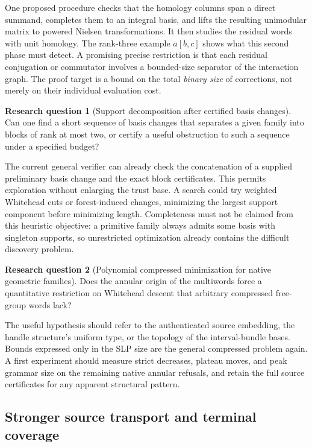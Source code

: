 \documentclass[11pt,a4paper]{article}
\theoremstyle{definition}
\newtheorem{question}{Research question}
\theoremstyle{remark}
\begin{document}
One proposed procedure checks that the homology columns span a direct
summand, completes them to an integral basis, and lifts the resulting
unimodular matrix to powered Nielsen transformations. It then studies the
residual words with unit homology. The rank-three example $a[b,c]$ shows
what this second phase must detect. A promising precise restriction is
that each residual conjugation or commutator involves a bounded-size
separator of the interaction graph. The proof target is a bound on the
total \emph{binary size} of corrections, not merely on their individual
evaluation cost.

\begin{question}[Support decomposition after certified basis changes]
Can one find a short sequence of basis changes that separates a given
family into blocks of rank at most two, or certify a useful obstruction to
such a sequence under a specified budget?
\end{question}

The current general verifier can already check the concatenation of a
supplied preliminary basis change and the exact block certificates. This
permits exploration without enlarging the trust base. A search could try
weighted Whitehead cuts or forest-induced changes, minimizing the largest
support component before minimizing length. Completeness must not be
claimed from this heuristic objective: a primitive family always admits
some basis with singleton supports, so unrestricted optimization already
contains the difficult discovery problem.

\begin{question}[Polynomial compressed minimization for native geometric
families]
Does the annular origin of the multiwords force a quantitative restriction
on Whitehead descent that arbitrary compressed free-group words lack?
\end{question}

The useful hypothesis should refer to the authenticated source embedding,
the handle structure's uniform type, or the topology of the interval-bundle
bases. Bounds expressed only in the SLP size are the general compressed
problem again. A first experiment should measure strict decreases, plateau
moves, and peak grammar size on the remaining native annular refusals, and
retain the full source certificates for any apparent structural pattern.

\subsection{Stronger source transport and terminal coverage}
\end{document}
